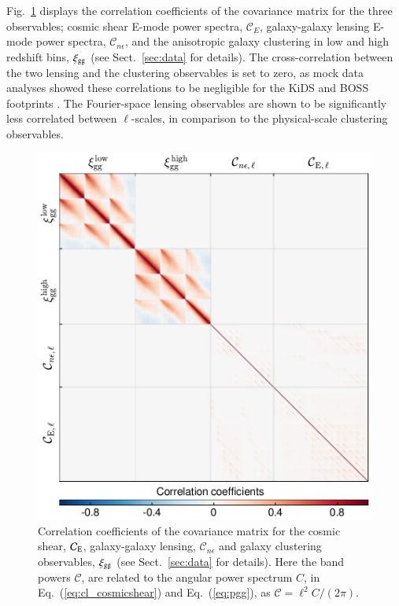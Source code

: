 \begin{appendix}
Fig.~\ref{fig:ttttpcov} displays the correlation coefficients of the \tttp covariance matrix for the three observables; cosmic shear E-mode power spectra, $\mathcal{C}_E$, galaxy-galaxy lensing E-mode power spectra, $\mathcal{C}_{n\epsilon}$, and the anisotropic galaxy clustering in low and high redshift bins, $\xi_{\rm gg}$ (see Sect.~\ref{sec:data} for details).   The cross-correlation between the two lensing and the clustering observables is set to zero, as mock data analyses showed these correlations to be negligible for the KiDS and BOSS footprints \citep{joachimi/etal:inprep}.  The Fourier-space lensing observables are shown to be significantly less correlated between $\ell$-scales, in comparison to the physical-scale clustering observables.
\begin{figure}
	\begin{center}
		\includegraphics[width=\columnwidth]{Data_Plots/corr_paper_wedge+aPneE+aPeeE_obs_tot_theory}
		\caption{Correlation coefficients of the \tttp covariance matrix for the cosmic shear, $\mathcal{C}_{\rm E}$, galaxy-galaxy lensing, $\mathcal{C}_{n\epsilon}$ and galaxy clustering observables, $\xi_{\rm gg}$ (see Sect.~\ref{sec:data} for details).  Here the band powers $\mathcal{C}$, are related to the angular power spectrum $C$, in Eq.~(\ref{eq:cl_cosmicshear}) and Eq.~(\ref{eq:pgg}), as $\mathcal{C}= \ell^2 C/(2\pi)$.}
		\label{fig:ttttpcov}
	\end{center}
\end{figure}


\end{appendix}
